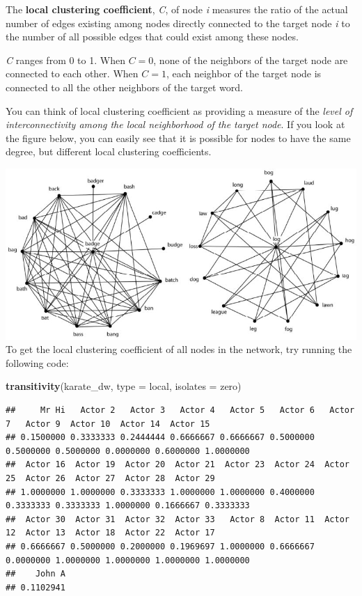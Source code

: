 \documentclass[
]{book}
\newenvironment{Shaded}{\begin{snugshade}}{\end{snugshade}}
\newcommand{\AttributeTok}[1]{\textcolor[rgb]{0.13,0.29,0.53}{#1}}
\newcommand{\FunctionTok}[1]{\textcolor[rgb]{0.13,0.29,0.53}{\textbf{#1}}}
\newcommand{\NormalTok}[1]{#1}
\newcommand{\StringTok}[1]{\textcolor[rgb]{0.31,0.60,0.02}{#1}}
\begin{document}
The \textbf{local clustering coefficient}, \emph{C}, of node \emph{i} measures the ratio of the actual number of edges existing among nodes directly connected to the target node \emph{i} to the number of all possible edges that could exist among these nodes.

\emph{C} ranges from 0 to 1. When \(C = 0\), none of the neighbors of the target node are connected to each other. When \(C = 1\), each neighbor of the target node is connected to all the other neighbors of the target word.

You can think of local clustering coefficient as providing a measure of the \emph{level of interconnectivity among the local neighborhood of the target node}. If you look at the figure below, you can easily see that it is possible for nodes to have the same degree, but different local clustering coefficients.

\includegraphics{images/hcc-lcc.jpg}
To get the local clustering coefficient of all nodes in the network, try running the following code:

\begin{Shaded}
\begin{Highlighting}[]
\FunctionTok{transitivity}\NormalTok{(karate\_dw, }\AttributeTok{type =} \StringTok{\textquotesingle{}local\textquotesingle{}}\NormalTok{, }\AttributeTok{isolates =} \StringTok{\textquotesingle{}zero\textquotesingle{}}\NormalTok{)}
\end{Highlighting}
\end{Shaded}

\begin{verbatim}
##     Mr Hi   Actor 2   Actor 3   Actor 4   Actor 5   Actor 6   Actor 7   Actor 9  Actor 10  Actor 14  Actor 15 
## 0.1500000 0.3333333 0.2444444 0.6666667 0.6666667 0.5000000 0.5000000 0.5000000 0.0000000 0.6000000 1.0000000 
##  Actor 16  Actor 19  Actor 20  Actor 21  Actor 23  Actor 24  Actor 25  Actor 26  Actor 27  Actor 28  Actor 29 
## 1.0000000 1.0000000 0.3333333 1.0000000 1.0000000 0.4000000 0.3333333 0.3333333 1.0000000 0.1666667 0.3333333 
##  Actor 30  Actor 31  Actor 32  Actor 33   Actor 8  Actor 11  Actor 12  Actor 13  Actor 18  Actor 22  Actor 17 
## 0.6666667 0.5000000 0.2000000 0.1969697 1.0000000 0.6666667 0.0000000 1.0000000 1.0000000 1.0000000 1.0000000 
##    John A 
## 0.1102941
\end{verbatim}
\end{document}
